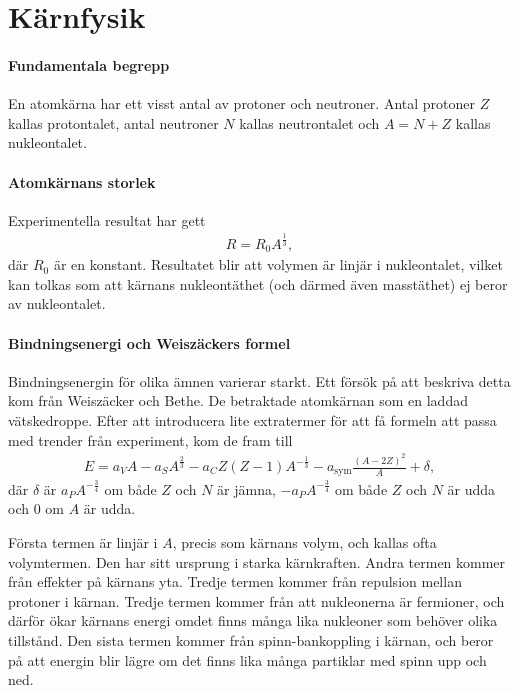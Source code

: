 \section{Kärnfysik}

\paragraph{Fundamentala begrepp}
En atomkärna har ett visst antal av protoner och neutroner. Antal protoner $Z$ kallas protontalet, antal neutroner $N$ kallas neutrontalet och $A = N + Z$ kallas nukleontalet.

\paragraph{Atomkärnans storlek}
Experimentella resultat har gett
\begin{align*}
	R = R_{0}A^{\frac{1}{3}},
\end{align*}
där $R_{0}$ är en konstant. Resultatet blir att volymen är linjär i nukleontalet, vilket kan tolkas som att kärnans nukleontäthet (och därmed även masstäthet) ej beror av nukleontalet.

\paragraph{Bindningsenergi och Weiszäckers formel}
Bindningsenergin för olika ämnen varierar starkt. Ett försök på att beskriva detta kom från Weiszäcker och Bethe. De betraktade atomkärnan som en laddad vätskedroppe. Efter att introducera lite extratermer för att få formeln att passa med trender från experiment, kom de fram till
\begin{align*}
	E = a_{V}A - a_{S}A^{\frac{2}{3}} - a_{C}Z(Z - 1)A^{-\frac{1}{3}} - a_{\text{sym}}\frac{(A - 2Z)^{2}}{A} + \delta,
\end{align*}
där $\delta$ är $a_{P}A^{-\frac{3}{4}}$ om både $Z$ och $N$ är jämna, $-a_{P}A^{-\frac{3}{4}}$ om både $Z$ och $N$ är udda och $0$ om $A$ är udda.

Första termen är linjär i $A$, precis som kärnans volym, och kallas ofta volymtermen. Den har sitt ursprung i starka kärnkraften. Andra termen kommer från effekter på kärnans yta. Tredje termen kommer från repulsion mellan protoner i kärnan. Tredje termen kommer från att nukleonerna är fermioner, och därför ökar kärnans energi omdet finns många lika nukleoner som behöver olika tillstånd. Den sista termen kommer från spinn-bankoppling i kärnan, och beror på att energin blir lägre om det finns lika många partiklar med spinn upp och ned.


